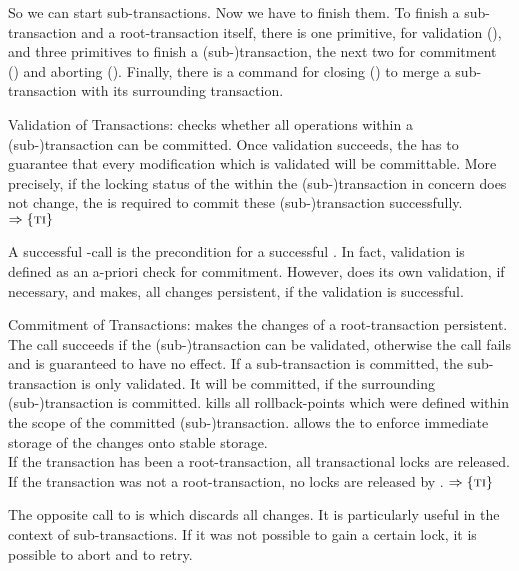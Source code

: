 \documentclass[a4paper, 12pt]{book}
\newcommand{\INTERFACE}[1]{$\Rightarrow\left\{#1\right\}$}
\begin{document}
So we can start sub-transactions. Now we have to finish them. To finish a
sub-transaction and a root-transaction itself, there is one primitive,
for validation (\dbaiTRVALIDATE), and three primitives to finish a
(sub-)transaction, the next two for commitment (\dbaiTRCOMMIT) and aborting
(\dbaiTRABORT). Finally, there is a command for closing (\dbaiTRCLOSE) to
merge a sub-transaction with its surrounding transaction.
%
\begin{requirement*}{Validation of Transactions: \dbaiTRVALIDATE}
  \dbaiTRVALIDATE checks whether all operations within a (sub-)transaction can
  be committed. Once validation succeeds, the \SYNEIGHT has to
  guarantee that every modification which is validated will be
  committable. More precisely, if the locking status of the 
  within the (sub-)transaction in concern does not change, the \SYNEIGHT
  is required to commit these (sub-)transaction successfully.\\
  \INTERFACE{\TRANSACTION}
\end{requirement*}
%
A successful \dbaiTRVALIDATE-call is the precondition for a successful
\dbaiTRCOMMIT. In fact, validation is defined as an a-priori check for
commitment. However, \dbaiTRCOMMIT does its own validation, if necessary, and
makes, all changes persistent, if the validation is successful.
%
\begin{requirement*}{Commitment of Transactions: \dbaiTRCOMMIT}
  \dbaiTRCOMMIT makes the changes of a root-transaction persistent. 
  The call succeeds if the (sub-)transaction can be validated, otherwise the
  call fails and is guaranteed to have no effect.
  If a sub-transaction is committed, the sub-transaction is only validated.
  It will be committed, if the surrounding (sub-)transaction is committed.
  \dbaiTRCOMMIT kills all rollback-points which were defined within the scope
  of the committed (sub-)transaction. 
  \dbaiTRCOMMIT allows the  to enforce immediate storage of the
  changes onto stable storage.\\
  If the transaction has been a root-transaction, all transactional locks are
  released. If the transaction was not a root-transaction, no locks
  are released by \dbaiTRCOMMIT.
  \INTERFACE{\TRANSACTION}
\end{requirement*}
%
The opposite call to \dbaiTRCOMMIT is \dbaiTRABORT which discards all
changes. It is particularly useful in the context of sub-transactions. If it
was not possible to gain a certain lock, it is possible to abort and to
retry. 
%
\end{document}
